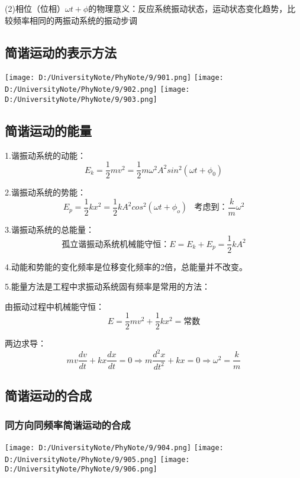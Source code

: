 \documentclass[UTF8]{article}
\begin{document}
    (2)相位（位相）$\omega t + \phi$的物理意义：反应系统振动状态，运动状态变化趋势，比较频率相同的两振动系统的振动步调

\subsection{简谐运动的表示方法}

    \texttt{[image: D:/UniversityNote/PhyNote/9/901.png]}
    \texttt{[image: D:/UniversityNote/PhyNote/9/902.png]}
    \texttt{[image: D:/UniversityNote/PhyNote/9/903.png]}

\subsection{简谐运动的能量}

    1.谐振动系统的动能：
    \[E_k = \frac{1}{2}mv^2 = \frac{1}{2}m\omega^2 A^2sin^2(\omega t + \phi_0)\]

    2.谐振动系统的势能：
    \[E_p = \frac{1}{2}kx^2 = \frac{1}{2}kA^2cos^2(\omega t + \phi_o)\;\;\;\mbox{考虑到：}\frac{k}{m}\omega^2\]

    3.谐振动系统的总能量：
    \[\mbox{孤立谐振动系统机械能守恒：}E = E_k + E_p = \frac{1}{2}kA^2\]

    4.动能和势能的变化频率是位移变化频率的2倍，总能量并不改变。

    5.能量方法是工程中求振动系统固有频率是常用的方法：

    由振动过程中机械能守恒：
    \[E = \frac{1}{2}mv^2 + \frac{1}{2}kx^2 = \mbox{常数}\]

    两边求导：
    \[mv\frac{dv}{dt} + kx\frac{dx}{dt} = 0\Longrightarrow m\frac{d^2x}{dt^2} + kx = 0\Longrightarrow \omega^2 = \frac{k}{m}\]

\subsection{简谐运动的合成}
\subsubsection{同方向同频率简谐运动的合成}

    \texttt{[image: D:/UniversityNote/PhyNote/9/904.png]}
    \texttt{[image: D:/UniversityNote/PhyNote/9/905.png]}
    \texttt{[image: D:/UniversityNote/PhyNote/9/906.png]}
\end{document}
